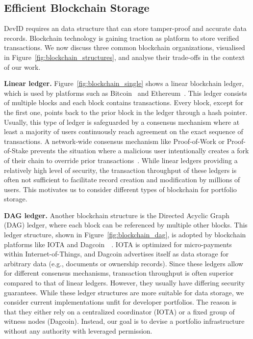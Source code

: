 \subsection{Efficient Blockchain Storage}
\label{subsec:scalable_blockchain}
DevID requires an data structure that can store tamper-proof and accurate data records.
Blockchain technology is gaining traction as platform to store verified transactions.
We now discuss three common blockchain organizations, visualised in Figure~\ref{fig:blockchain_structures}, and analyse their trade-offs in the context of our work.

\textbf{Linear ledger.} Figure~\ref{fig:blockchain_single} shows a linear blockchain ledger, which is used by platforms such as Bitcoin~\cite{nakamoto2008bitcoin} and Ethereum~\cite{wood2014ethereum}.
This ledger consists of multiple blocks and each block contains transactions.
Every block, except for the first one, points back to the prior block in the ledger through a hash pointer.
Usually, this type of ledger is safeguarded by a consensus mechanism where at least a majority of users continuously reach agreement on the exact sequence of transactions.
A network-wide consensus mechanism like Proof-of-Work or Proof-of-Stake prevents the situation where a malicious user intentionally creates a fork of their chain to override prior transactions~\cite{vukolic2015quest}.
While linear ledgers providing a relatively high level of security, the transaction throughput of these ledgers is often not sufficient to facilitate record creation and modification by millions of users.
This motivates us to consider different types of blockchain for portfolio storage.

\textbf{DAG ledger.} Another blockchain structure is the Directed Acyclic Graph (DAG) ledger, where each block can be referenced by multiple other blocks.
This ledger structure, shown in Figure~\ref{fig:blockchain_dag}, is adopted by blockchain platforms like IOTA and Dagcoin~\cite{popov2018tangle}~\cite{lerner2015dagcoin}.
IOTA is optimized for micro-payments within Internet-of-Things, and Dagcoin advertises itself as data storage for arbitrary data (e.g., documents or ownership records).
Since these ledgers allow for different consensus mechanisms, transaction throughput is often superior compared to that of linear ledgers.
However, they usually have differing security guarantees.
While these ledger structures are more suitable for data storage, we consider current implementations unfit for developer portfolios.
The reason is that they either rely on a centralized coordinator (IOTA) or a fixed group of witness nodes (Dagcoin).
Instead, our goal is to devise a portfolio infrastructure without any authority with leveraged permission.

